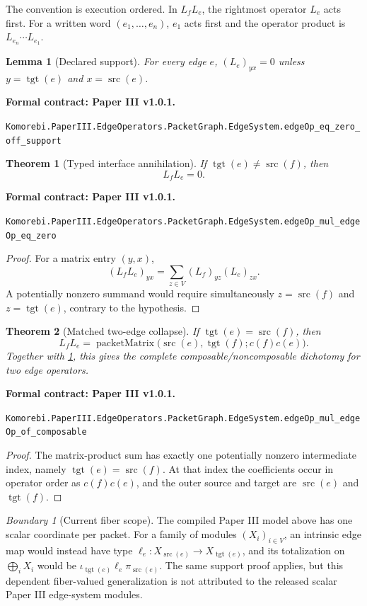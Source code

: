 \documentclass[11pt,a4paper]{article}
\newtheorem{theorem}{Theorem}[section]
\theoremstyle{plain}
\newtheorem{lemma}[lemma]{Lemma}
\theoremstyle{definition}
\theoremstyle{remark}
\newtheorem{boundary}[boundary]{Boundary}
\newcommand{\src}{\operatorname{src}}
\newcommand{\tgt}{\operatorname{tgt}}
\newcommand{\leanname}[1]{\nolinkurl{#1}}
\newcommand{\statusleanthree}[1]{\par\smallskip\noindent\begin{minipage}{\linewidth}{\color{leanblue}\textbf{Formal contract: Paper III v1.0.1.}}\par\begingroup\small\raggedright\leanname{#1}\par\endgroup\end{minipage}\par\smallskip}
\begin{document}
The convention is execution ordered.  In $L_fL_e$, the rightmost operator
$L_e$ acts first.  For a written word $(e_1,\ldots,e_n)$, $e_1$ acts first
and the operator product is $L_{e_n}\cdots L_{e_1}$.

\begin{lemma}[Declared support]
\label{lem:edge-support}
For every edge $e$, $(L_e)_{yx}=0$ unless
$y=\tgt(e)$ and $x=\src(e)$.
\end{lemma}
\statusleanthree{Komorebi.PaperIII.EdgeOperators.PacketGraph.EdgeSystem.edgeOp_eq_zero_off_support}

\begin{theorem}[Typed interface annihilation]
\label{thm:edge-annihilation}
If $\tgt(e)\ne\src(f)$, then
\[
  L_fL_e=0.
\]
\end{theorem}
\statusleanthree{Komorebi.PaperIII.EdgeOperators.PacketGraph.EdgeSystem.edgeOp_mul_edgeOp_eq_zero}

\begin{proof}
For a matrix entry $(y,x)$,
\[
  (L_fL_e)_{yx}=\sum_{z\in V}(L_f)_{yz}(L_e)_{zx}.
\]
A potentially nonzero summand would require simultaneously
$z=\src(f)$ and $z=\tgt(e)$, contrary to the hypothesis.
\end{proof}

\begin{theorem}[Matched two-edge collapse]
\label{thm:edge-composable}
If $\tgt(e)=\src(f)$, then
\[
L_fL_e
=
\operatorname{packetMatrix}
\bigl(\src(e),\tgt(f);c(f)c(e)\bigr).
\]
Together with \cref{thm:edge-annihilation}, this gives the complete
composable/noncomposable dichotomy for two edge operators.
\end{theorem}
\statusleanthree{Komorebi.PaperIII.EdgeOperators.PacketGraph.EdgeSystem.edgeOp_mul_edgeOp_of_composable}

\begin{proof}
The matrix-product sum has exactly one potentially nonzero intermediate
index, namely $\tgt(e)=\src(f)$.  At that index the coefficients occur in
operator order as $c(f)c(e)$, and the outer source and target are
$\src(e)$ and $\tgt(f)$.
\end{proof}

\begin{boundary}[Current fiber scope]
The compiled Paper III model above has one scalar coordinate per packet.
For a family of modules $(X_i)_{i\in V}$, an intrinsic edge map would instead
have type $\ell_e:X_{\src(e)}\to X_{\tgt(e)}$, and its totalization on
$\bigoplus_iX_i$ would be
$\iota_{\tgt(e)}\ell_e\pi_{\src(e)}$.  The same support proof applies, but
this dependent fiber-valued generalization is not attributed to the released
scalar Paper III edge-system modules.
\end{boundary}
\end{document}
